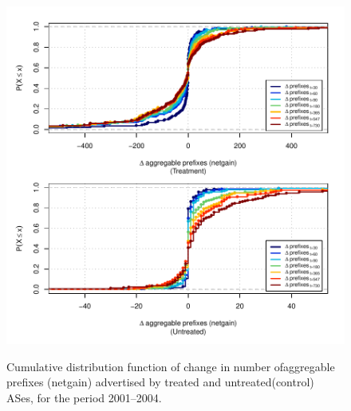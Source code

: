 \begin{figure}[H]
\begin{centering}
\begin{singlespace}
    \includegraphics[width=6in]{figures/behavior-netgain-2001_2004-corr.pdf}
    \vspace{-2em}\\
    \caption{Cumulative distribution function of change in number ofaggregable
    prefixes (netgain) advertised by treated and untreated(control) ASes, for
    the period 2001--2004.}
\end{singlespace}
\end{centering}
\end{figure}
